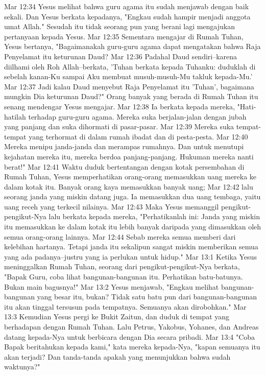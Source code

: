 Mar 12:34  Yesus melihat bahwa guru agama itu sudah menjawab dengan baik sekali. Dan Yesus berkata kepadanya, "Engkau sudah hampir menjadi anggota umat Allah." Sesudah itu tidak seorang pun yang berani lagi mengajukan pertanyaan kepada Yesus.
Mar 12:35  Sementara mengajar di Rumah Tuhan, Yesus bertanya, "Bagaimanakah guru-guru agama dapat mengatakan bahwa Raja Penyelamat itu keturunan Daud?
Mar 12:36  Padahal Daud sendiri--karena diilhami oleh Roh Allah--berkata, 'Tuhan berkata kepada Tuhanku: duduklah di sebelah kanan-Ku sampai Aku membuat musuh-musuh-Mu takluk kepada-Mu.'
Mar 12:37  Jadi kalau Daud menyebut Raja Penyelamat itu 'Tuhan', bagaimana mungkin Dia keturunan Daud?" Orang banyak yang berada di Rumah Tuhan itu senang mendengar Yesus mengajar.
Mar 12:38  Ia berkata kepada mereka, "Hati-hatilah terhadap guru-guru agama. Mereka suka berjalan-jalan dengan jubah yang panjang dan suka dihormati di pasar-pasar.
Mar 12:39  Mereka suka tempat-tempat yang terhormat di dalam rumah ibadat dan di pesta-pesta.
Mar 12:40  Mereka menipu janda-janda dan merampas rumahnya. Dan untuk menutupi kejahatan mereka itu, mereka berdoa panjang-panjang. Hukuman mereka nanti berat!"
Mar 12:41  Waktu duduk bertentangan dengan kotak persembahan di Rumah Tuhan, Yesus memperhatikan orang-orang memasukkan uang mereka ke dalam kotak itu. Banyak orang kaya memasukkan banyak uang;
Mar 12:42  lalu seorang janda yang miskin datang juga. Ia memasukkan dua uang tembaga, yaitu uang receh yang terkecil nilainya.
Mar 12:43  Maka Yesus memanggil pengikut-pengikut-Nya lalu berkata kepada mereka, "Perhatikanlah ini: Janda yang miskin itu memasukkan ke dalam kotak itu lebih banyak daripada yang dimasukkan oleh semua orang-orang lainnya.
Mar 12:44  Sebab mereka semua memberi dari kelebihan hartanya. Tetapi janda itu sekalipun sangat miskin memberikan semua yang ada padanya--justru yang ia perlukan untuk hidup."
Mar 13:1  Ketika Yesus meninggalkan Rumah Tuhan, seorang dari pengikut-pengikut-Nya berkata, "Bapak Guru, coba lihat bangunan-bangunan itu. Perhatikan batu-batunya. Bukan main bagusnya!"
Mar 13:2  Yesus menjawab, "Engkau melihat bangunan-bangunan yang besar itu, bukan? Tidak satu batu pun dari bangunan-bangunan itu akan tinggal tersusun pada tempatnya. Semuanya akan dirobohkan."
Mar 13:3  Kemudian Yesus pergi ke Bukit Zaitun, dan duduk di tempat yang berhadapan dengan Rumah Tuhan. Lalu Petrus, Yakobus, Yohanes, dan Andreas datang kepada-Nya untuk berbicara dengan Dia secara pribadi.
Mar 13:4  "Coba Bapak beritahukan kepada kami," kata mereka kepada-Nya, "kapan semuanya itu akan terjadi? Dan tanda-tanda apakah yang menunjukkan bahwa sudah waktunya?"
